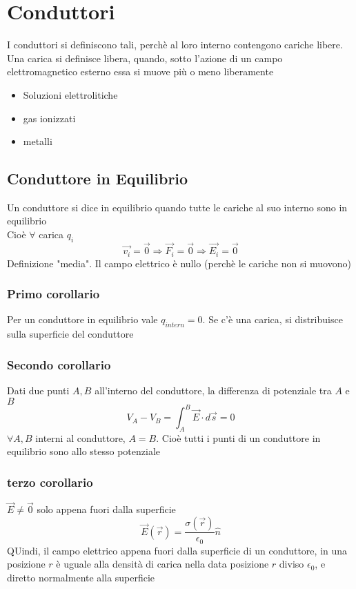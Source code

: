 \documentclass[a4paper]{report}
\begin{document}
  \section{Conduttori}
  I conduttori si definiscono tali, perchè al loro interno contengono cariche libere. Una carica si definisce libera, quando, sotto l'azione di un campo elettromagnetico esterno essa si muove più o meno liberamente
  \begin{itemize}
    \item Soluzioni elettrolitiche
      \item gas ionizzati
    \item metalli
  \end{itemize}

  \subsection{Conduttore in Equilibrio}
  Un conduttore si dice in equilibrio quando tutte le cariche al suo interno sono in equilibrio\\
  Cioè $\forall$ carica $q_i$
  $$\vec{v_i} = \vec{0} \Rightarrow \vec{F_i} = \vec{0} \Rightarrow \vec{E_i} = \vec{0}$$
  Definizione "media". Il campo elettrico è nullo (perchè le cariche non si muovono)

  \subsubsection{Primo corollario}
  Per un conduttore in equilibrio vale $q_{intern} =0$. Se c'è una carica, si distribuisce sulla superficie del conduttore
  \subsubsection{Secondo corollario}
  Dati due punti $A, B$ all'interno del conduttore, la differenza di potenziale tra $A$ e $B$
  $$V_A - V_B = \int_A^B \vec{E}\cdot d\vec{s}=0 $$
  $\forall A,B$ interni al conduttore, $A=B$. Cioè tutti i punti di un conduttore in equilibrio sono allo stesso potenziale
  \subsubsection{terzo corollario}
  \( \vec{E} \neq \vec{0} \) solo appena fuori dalla superficie
  $$ \vec{E}(\vec{r}) = \frac{\sigma(\vec{r})}{\epsilon_0} \hat{n} $$
  QUindi, il campo elettrico appena fuori dalla superficie di un conduttore, in una posizione $r$ è uguale alla densità di carica nella data posizione $r$ diviso $\epsilon_0$, e diretto normalmente alla superficie
\end{document}
